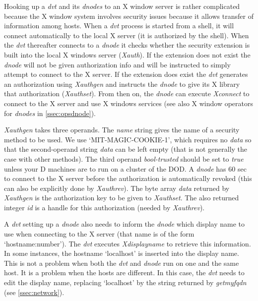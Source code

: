 
Hooking up a \emph{dvt} and its \emph{dnodes} to an X window server is rather complicated because the X window system involves security issues because it allows transfer of information among hosts. When a \emph{dvt} process is started from a shell, it will connect automatically to the local X server (it is authorized by the shell). When the \emph{dvt} thereafter connects to a \emph{dnode} it checks whether the security extension is built into the local X windows server (\emph{Xauth}). If the extension does not exist the \emph{dnode} will not be given authorization info and will be instructed to simply attempt to connect to the X server. If the extension does exist the \emph{dvt} generates an authorization using \emph{Xauthgen} and instructs the \emph{dnode} to give its X library that authorization (\emph{Xauthset}). From then on, the \emph{dnode} can execute \emph{Xconnect} to connect to the X server and use X windows services (see also X window operators for \emph{dnodes} in \ref{ssec:opsdnode}).

\emph{Xauthgen} takes three operands. The \emph{name} string gives the name of a security method to be used. We use `MIT-MAGIC-COOKIE-1', which requires no \emph{data} so that the second-operand string \emph{data} can be left empty (that is not generally the case with other methods). The third operand \emph{bool-trusted} should be set to \emph{true} unless your D machines are to run on a cluster of the DOD. A \emph{dnode} has 60 sec to connect to the X server before the authorization is automatically revoked (this can also be explicitly done by \emph{Xauthrev}). The byte array \emph{data} returned by \emph{Xauthgen} is the authorization key to be given to \emph{Xauthset}. The also returned integer \emph{id} is a handle for this authorization (needed by \emph{Xauthrev}).

A \emph{dvt} setting up a \emph{dnode} also needs to inform the \emph{dnode} which display name to use when connecting to the X server (that name is of the form `hostname:number'). The \emph{dvt} executes \emph{Xdisplayname} to retrieve this information. In some instances, the hostname `localhost' is inserted into the display name. This is not a problem when both the \emph{dvt} and \emph{dnode} run on one and the same host. It is a problem when the hosts are different. In this case, the \emph{dvt} needs to edit the display name, replacing `localhost' by the string returned by \emph{getmyfqdn} (see \ref{ssec:network}). 

